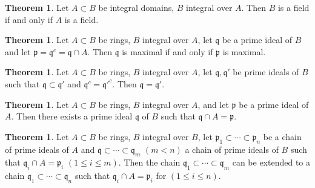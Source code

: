 \documentclass[a4paper]{book}
\theoremstyle{definition}
\newtheorem{theorem}[definition]{Theorem}
\begin{document}
\begin{thmbox}
    \begin{theorem}
        Let \(A \subset B\) be integral domains, \(B\) integral over \(A\). Then \(B\) is a field if and only if \(A\) is a field.
    \end{theorem}
\end{thmbox}

\begin{thmbox}
    \begin{theorem}
        Let \(A \subset B\) be rings, \(B\) integral over \(A\), let \(\mathfrak{q}\) be a prime ideal of \(B\) and let \(\mathfrak{p} = \mathfrak{q}^c = \mathfrak{q} \cap A\). Then \(\mathfrak{q}\) is maximal if and only if \(\mathfrak{p}\) is maximal.
    \end{theorem}
\end{thmbox}

\begin{thmbox}
    \begin{theorem}
        Let \(A \subset B\) be rings, \(B\) integral over \(A\), let \(\mathfrak{q}, \mathfrak{q}'\) be prime ideals of \(B\) such that \(\mathfrak{q} \subset \mathfrak{q}'\) and \(\mathfrak{q}^c = \mathfrak{q}'^c\). Then \(\mathfrak{q} = \mathfrak{q}'\).
    \end{theorem}
\end{thmbox}

\begin{thmbox}
    \begin{theorem}
        Let \(A \subset B\) be rings, \(B\) integral over \(A\), and let \(\mathfrak{p}\) be a prime ideal of \(A\). Then there exists a prime ideal \(\mathfrak{q}\) of \(B\) such that \(\mathfrak{q} \cap A = \mathfrak{p}\).
    \end{theorem}
\end{thmbox}



\begin{thmbox}
    \begin{theorem}
        Let \(A \subset B\) be rings, \(B\) integral over \(B\), let \(\mathfrak{p}_1 \subset \cdots \subset \mathfrak{p}_n\) be a chain of prime ideals of \(A\) and \(\mathfrak{q} \subset \cdots \subset \mathfrak{q}_m\) \((m < n)\) a chain of prime ideals of \(B\) such that \(\mathfrak{q}_i \cap A = \mathfrak{p}_i\) \((1 \leq i \leq m)\). Then the chain \(\mathfrak{q}_1 \subset \cdots \subset \mathfrak{q}_m\) can be extended to a chain \(\mathfrak{q}_1 \subset \cdots \subset \mathfrak{q}_n\) such that \(\mathfrak{q}_i \cap A = \mathfrak{p}_i\) for \((1 \leq i \leq n)\).
    \end{theorem}
\end{thmbox}
\end{document}
